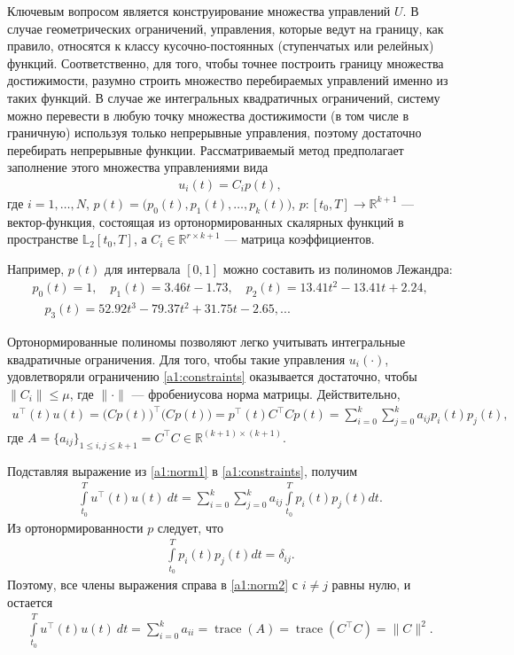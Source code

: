 \documentclass[../main.tex]{subfiles}
\begin{document}
Ключевым вопросом является конструирование множества управлений $U$.
 В случае геометрических ограничений, управления, которые ведут на границу, как правило, относятся к классу кусочно-постоянных (ступенчатых или релейных) функций.
 Соответственно, для того, чтобы точнее построить границу множества достижимости, разумно строить множество перебираемых управлений именно из таких функций. 
 В случае же интегральных квадратичных ограничений, систему можно перевести в любую точку множества достижимости (в том числе в граничную) используя только непрерывные управления, поэтому достаточно перебирать непрерывные функции. 
 Рассматриваемый метод предполагает заполнение этого множества управлениями вида 
 \begin{gather}\label{a1:control}
 	u_i(t) = C_i p (t),
 \end{gather}
 где $ i = 1, \dots, N$, $p(t) = \big(p_{0}(t),p_{1}(t),\dots,p_{k}(t)\big)$, $p: [t_0, {T}] \rightarrow \mathbb{R}^{k+1} $ --- вектор-функция, состоящая из ортонормированных скалярных функций в пространстве $\mathbb{L}_2[t_0, {T}]$, а $C_i \in \mathbb{R}^{r \times k+1}$ --- матрица коэффициентов. 
	 
 Например, $p(t)$ для интервала $[0,1]$ можно составить из полиномов Лежандра:
 \begin{gather*}
 	p_0(t) = 1, \quad p_1(t) = 3.46t-1.73, \quad p_2(t) = 13.41t^2 - 13.41t + 2.24, \\ \quad 
 	p_3(t) = 52.92t^3 - 79.37t^2+31.75t -2.65, ...
 \end{gather*}
 
 Ортонормированные полиномы позволяют легко учитывать интегральные квадратичные ограничения.
 Для того, чтобы такие управления $u_i(\cdot)$, удовлетворяли ограничению \eqref{a1:constraints} оказывается достаточно, чтобы $\|C_i\| \leqslant \mu$, где $\|\cdot\| $ --- фробениусова норма матрицы.
 Действительно,
 \begin{gather}\label{a1:norm1}
 	 u^{\top}(t) u(t) = \big(C p(t)\big)^{\top} \big(C p(t)\big) = p^{\top}(t) C^{\top} C p(t) = \sum_{i=0}^k \sum_{j=0}^k a_{ij} p_i(t) p_j(t),
 \end{gather}
 где $ A = \{a_{ij}\}_{1\leqslant i,j \leqslant k + 1} = C^{\top} C \in \mathbb{R}^{(k+1) × (k+1)} $.
 
 Подставляя выражение из \eqref{a1:norm1} в \eqref{a1:constraints}, получим
 \begin{gather}\label{a1:norm2}
 		\int\limits_{t_0}^T u^{\top}(t) u(t) \ dt = \sum_{i=0}^k \sum_{j=0}^k a_{ij} \int\limits_{t_0}^T p_i(t) p_j(t) dt.
 \end{gather}
 Из ортонормированности $p$ следует, что 
 \begin{gather}
 	\int\limits_{t_0}^T p_i(t) p_j(t) dt = \delta_{ij}. 
 \end{gather}
 Поэтому, все члены выражения справа в \eqref{a1:norm2} с $i \neq j$ равны нулю, и остается 
 \begin{gather}
 	\int\limits_{t_0}^T u^{\top}(t) u(t) \ dt = \sum_{i=0}^k a_{ii} = \operatorname{trace}(A) = \operatorname{trace}(C^{\top} C) = \| C\|^2.
 \end{gather}
 
\end{document}
